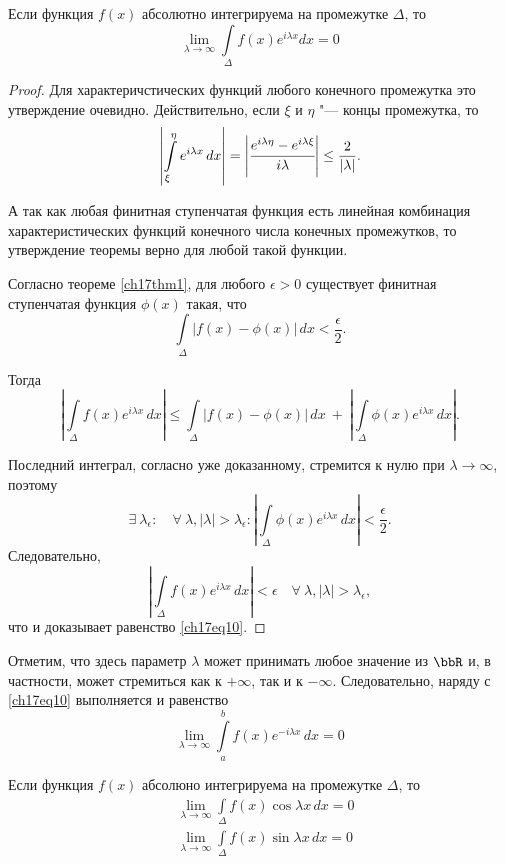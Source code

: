 \begin{thm} \label{ch17thm2}
Если функция $f(x)$ абсолютно интегрируема на промежутке $\Delta$, то
\begin{equation} \label{ch17eq10}
\lim_{\lambda \to \infty}\int\limits_{\Delta} f(x)e^{i\lambda x}dx = 0
\end{equation}
\end{thm}
\begin{proof}
Для характеричстических функций любого конечного промежутка это утверждение очевидно. Действительно, если $\xi$ и $\eta$ "--- концы промежутка, то
$$
\left|\int\limits_{\xi}^{\eta} e^{i\lambda x}\,dx\right| = \left|\cfrac{e^{i\lambda \eta} - e^{i\lambda \xi}}{i\lambda}\right| \le \frac{2}{|\lambda|}.
$$

А так как любая финитная ступенчатая функция есть линейная комбинация характеристических функций конечного числа конечных промежутков, то утверждение теоремы верно для любой такой функции.

Согласно теореме \ref{ch17thm1}, для любого $\epsilon > 0$ существует финитная ступенчатая функция $\phi(x)$ такая, что
$$
\int\limits_{\Delta} |f(x) - \phi(x)|\,dx < \frac{\epsilon}{2}.
$$

Тогда
$$
\left|\int\limits_{\Delta} f(x)e^{i\lambda x}\,dx\right| \le \int\limits_{\Delta} |f(x) - \phi(x)|\,dx\ +\ \left|\int\limits_{\Delta} \phi(x)e^{i\lambda x}\,dx\right|.
$$

Последний интеграл, согласно уже доказанному, стремится к нулю при $\lambda \to \infty$, поэтому
$$
\exists\ \lambda_{\epsilon} : \quad \forall\ \lambda, |\lambda| > \lambda_{\epsilon} : \left|\int\limits_{\Delta} \phi(x)e^{i\lambda x}\,dx\right| < \frac{\epsilon}{2}.
$$
Следовательно,
$$
\left|\int\limits_{\Delta} f(x)e^{i\lambda x}\,dx\right| < \epsilon \quad \forall\ \lambda, |\lambda| > \lambda_{\epsilon},
$$
что и доказывает равенство \eqref{ch17eq10}.
\end{proof}

Отметим, что здесь параметр $\lambda$ может принимать любое значение из $\bbR$ и, в частности, может стремиться как к $+\infty$, так и к $-\infty$. Следовательно, наряду с \eqref{ch17eq10} выполняется и равенство
$$
\lim_{\lambda \to \infty}\int\limits_{a}^{b} f(x)e^{-i\lambda x}\,dx = 0
$$

\begin{cons}
Если функция $f(x)$ абсолюно интегрируема на промежутке $\Delta$, то
\begin{align*}
&\lim_{\lambda \to \infty}\int\limits_{\Delta} f(x)\cos{\lambda x}\,dx = 0\\
&\lim_{\lambda \to \infty}\int\limits_{\Delta} f(x)\sin{\lambda x}\,dx = 0
\end{align*}
\end{cons}

